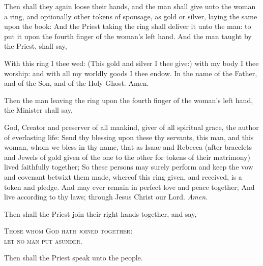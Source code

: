 \begin{rubric}
	Then shall they again loose their hands, and the man shall give unto the woman a ring, and 
	optionally other tokens of spousage, as gold or silver, laying the same upon the book: And the Priest taking the ring shall deliver it unto the man: to put it upon the fourth finger of the woman's left hand. And the man taught by the Priest, shall say,
\end{rubric}\par\noindent
With this ring I thee wed: (This gold and silver I thee give:) with my body I thee worship: and with all my worldly goods I thee endow. In the name of the Father, and of the Son, and of the Holy Ghost. Amen.
\begin{rubric}
	Then the man leaving the ring upon the fourth finger of the woman's left hand, the Minister shall say,
\end{rubric}
{} God, Creator and preserver of all mankind, giver of all spiritual grace, the author of everlasting life: Send thy blessing upon these thy servants, this man, and this woman, whom we bless in thy name, that as Isaac and Rebecca (after bracelets and Jewels of gold given of the one to the other for tokens of their matrimony) lived faithfully together; So these persons may surely perform and keep the vow and covenant betwixt them made, whereof this ring given, and received, is a token and pledge. And may ever remain in perfect love and peace together; And live according to thy laws; through Jesus Christ our Lord. \textit{Amen.}
\begin{rubric}
	Then shall the Priest join their right hands together, and say,
\end{rubric}
\begin{center}
    \textsc{Those whom God hath joined together:\\let no man put asunder.}
\end{center}
\begin{rubric}
	Then shall the Priest speak unto the people.
\end{rubric}
